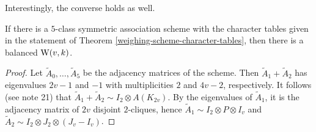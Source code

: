 \documentclass[../../../main]{subfiles}
\begin{document}
Interestingly, the converse holds as well.

\begin{thm}\label{bw-from-scheme-theorem}
 If there is a $5$-class symmetric association scheme with the character tables given in the statement of Theorem \ref{weighing-scheme-character-tables}, then there is a balanced $\text{W}(v,k)$.
\end{thm}

\begin{proof}
 Let $\tilde A_0, \dots, \tilde A_5$ be the adjacency matrices of the scheme. Then $\tilde A_1 + \tilde A_2$ has eigenvalues $2v-1$ and $-1$ with multiplicities $2$ and $4v-2$, respectively. It follows (see note 21) that $\tilde A_1 + \tilde A_2 \sim I_2 \otimes A(K_{2v})$. By the eigenvalues of $\tilde A_1$, it is the adjacency matrix of $2v$ disjoint $2$-cliques, hence $\tilde A_1 \sim I_2 \otimes P \otimes I_v$ and $\tilde A_2 \sim I_2 \otimes J_2 \otimes (J_v-I_v)$.
 

\end{proof}
\end{document}
